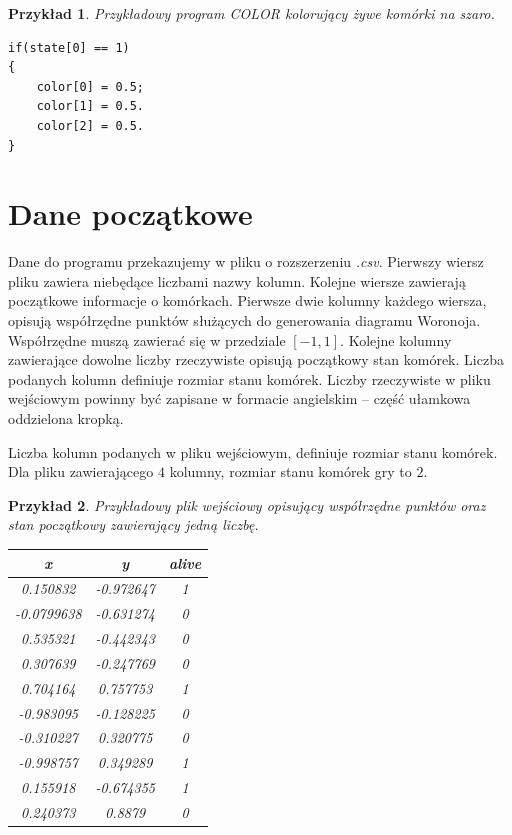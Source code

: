 \documentclass[declaration,shortabstract, inz]{iithesis}
\theoremstyle{definition} \newtheorem{definition}{Definicja}[]
\theoremstyle{plain} \newtheorem{remark}[definition]{Obserwacja}
\theoremstyle{plain} \newtheorem{theorem}[definition]{Twierdzenie}
\theoremstyle{plain} \newtheorem{example}{Przykład}[definition]
\theoremstyle{plain} \newtheorem{lemma}[definition]{Lemat}
\begin{document}
\begin{example}
Przykładowy program \textit{COLOR} kolorujący żywe komórki na szaro.
\begin{center}
\begin{lstlisting}
if(state[0] == 1)
{
	color[0] = 0.5;
	color[1] = 0.5.
	color[2] = 0.5.
}
\end{lstlisting}
\end{center}
\end{example}

\section{Dane początkowe}
Dane do programu przekazujemy w pliku o rozszerzeniu \textit{.csv}. Pierwszy wiersz pliku zawiera niebędące liczbami nazwy kolumn. Kolejne wiersze zawierają początkowe informacje o komórkach. Pierwsze dwie kolumny każdego wiersza, opisują współrzędne punktów służących do generowania diagramu Woronoja.  Współrzędne muszą zawierać się w przedziale $[-1, 1]$. Kolejne kolumny zawierające dowolne liczby rzeczywiste opisują początkowy stan komórek. Liczba podanych kolumn definiuje rozmiar stanu komórek. Liczby rzeczywiste w pliku wejściowym powinny być zapisane w formacie angielskim -- część ułamkowa oddzielona kropką.

Liczba kolumn podanych w pliku wejściowym, definiuje rozmiar stanu komórek. Dla pliku zawierającego $4$ kolumny, rozmiar stanu komórek gry to $2$.

\begin{example}
Przykładowy plik wejściowy opisujący współrzędne punktów oraz stan początkowy zawierający jedną liczbę.
\begin{center}
\begin{tabular}{ |c|c|c| } 
 \hline
 x & y & alive \\
  \hline 
 0.150832 & -0.972647 & 1 \\ 
  \hline
 -0.0799638 & -0.631274 & 0 \\
 \hline
  0.535321 & -0.442343 & 0 \\
 \hline
  0.307639 & -0.247769 & 0 \\
 \hline
  0.704164 & 0.757753 & 1 \\
 \hline
 -0.983095 & -0.128225 & 0 \\
 \hline
 -0.310227 & 0.320775 & 0 \\
 \hline
  -0.998757 & 0.349289 & 1 \\
 \hline
  0.155918 & -0.674355 & 1 \\
 \hline
   0.240373 & 0.8879 & 0 \\
 \hline
\end{tabular}
\end{center}
\end{example}
\end{document}
